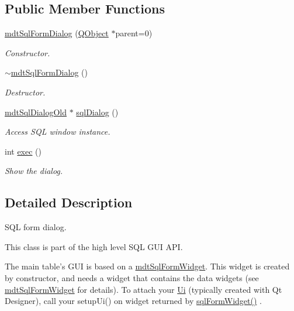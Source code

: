 \subsection*{Public Member Functions}
\begin{DoxyCompactItemize}
\item 
\hyperlink{classmdt_sql_form_dialog_af60a25c2654f0af7c62df42854af4bb1}{mdt\-Sql\-Form\-Dialog} (\hyperlink{class_q_object}{Q\-Object} $\ast$parent=0)
\begin{DoxyCompactList}\small\item\em Constructor. \end{DoxyCompactList}\item 
\hyperlink{classmdt_sql_form_dialog_ac75cd78f6fc2ccac75a6d6fab6922a5e}{$\sim$mdt\-Sql\-Form\-Dialog} ()
\begin{DoxyCompactList}\small\item\em Destructor. \end{DoxyCompactList}\item 
\hyperlink{classmdt_sql_dialog_old}{mdt\-Sql\-Dialog\-Old} $\ast$ \hyperlink{classmdt_sql_form_dialog_a9496867a9d00cf436055cf358c78dfbb}{sql\-Dialog} ()
\begin{DoxyCompactList}\small\item\em Access S\-Q\-L window instance. \end{DoxyCompactList}\item 
int \hyperlink{classmdt_sql_form_dialog_abc0e9db0da2b1e27d7f5853ecc465c1a}{exec} ()
\begin{DoxyCompactList}\small\item\em Show the dialog. \end{DoxyCompactList}\end{DoxyCompactItemize}


\subsection{Detailed Description}
S\-Q\-L form dialog. 

This class is part of the high level S\-Q\-L G\-U\-I A\-P\-I.

The main table's G\-U\-I is based on a \hyperlink{classmdt_sql_form_widget}{mdt\-Sql\-Form\-Widget}. This widget is created by constructor, and needs a widget that contains the data widgets (see \hyperlink{classmdt_sql_form_widget}{mdt\-Sql\-Form\-Widget} for details). To attach your \hyperlink{namespace_ui}{Ui} (typically created with Qt Designer), call your setup\-Ui() on widget returned by \hyperlink{classmdt_sql_form_old_ae0e5815ceaced65e8465adc2fe887c51}{sql\-Form\-Widget()} .


